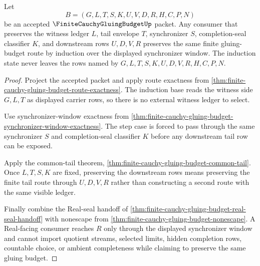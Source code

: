 \begin{theorem}
\label{thm:finite-cauchy-gluing-budget-synchronizer-ledger-induction}
Let
$$
B=(G,L,T,S,K,U,V,D,R,H,C,P,N)
$$
be an accepted $\FiniteCauchyGluingBudgetUp$ packet. Any consumer that preserves the witness ledger $L$, tail envelope $T$, synchronizer $S$, completion-seal classifier $K$, and downstream rows $U,D,V,R$ preserves the same finite gluing-budget route by induction over the displayed synchronizer window. The induction state never leaves the rows named by $G,L,T,S,K,U,D,V,R,H,C,P,N$.
\end{theorem}
\begin{proof}
Project the accepted packet and apply route exactness from \autoref{thm:finite-cauchy-gluing-budget-route-exactness}. The induction base reads the witness side $G,L,T$ as displayed carrier rows, so there is no external witness ledger to select.

Use synchronizer-window exactness from \autoref{thm:finite-cauchy-gluing-budget-synchronizer-window-exactness}. The step case is forced to pass through the same synchronizer $S$ and completion-seal classifier $K$ before any downstream tail row can be exposed.

Apply the common-tail theorem, \autoref{thm:finite-cauchy-gluing-budget-common-tail}. Once $L,T,S,K$ are fixed, preserving the downstream rows means preserving the finite tail route through $U,D,V,R$ rather than constructing a second route with the same visible ledger.

Finally combine the Real-seal handoff of \autoref{thm:finite-cauchy-gluing-budget-real-seal-handoff} with nonescape from \autoref{thm:finite-cauchy-gluing-budget-nonescape}. A Real-facing consumer reaches $R$ only through the displayed synchronizer window and cannot import quotient streams, selected limits, hidden completion rows, countable choice, or ambient completeness while claiming to preserve the same gluing budget.
\end{proof}

